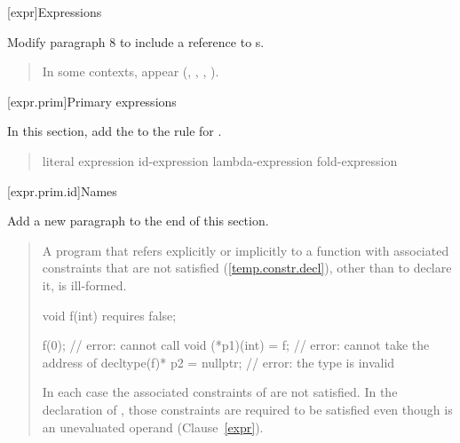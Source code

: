 

\setcounter{chapter}{7}
[expr]{Expressions}

Modify paragraph 8 to include a reference to s.

\begin{quote}
\pnum
In some contexts,  appear
(\added{\ref{expr.prim.req}, }, , 
, ).
\end{quote}

[expr.prim]{Primary expressions}

In this section, add the
 to the rule for 
.

\begin{quote}
\begin{bnf}
\br
    literal\br
    \br
    \terminal{(} expression \terminal{)}\br
    id-expression\br
    lambda-expression\br
    fold-expression\br
\end{bnf}
\end{quote}

\setcounter{subsection}{3}
[expr.prim.id]{Names}

Add a new paragraph to the end of this section.

\begin{quote}
\begin{addedblock}
\setcounter{Paras}{2}
\pnum
A program that refers explicitly or implicitly to a function with associated 
constraints that are not satisfied (\ref{temp.constr.decl}), other than to 
declare it, is ill-formed.
% 
\enterexample
\begin{codeblock}
void f(int) requires false;

f(0);                      // error: cannot call 
void (*p1)(int) = f;       // error: cannot take the address of 
decltype(f)* p2 = nullptr; // error: the type  is invalid
\end{codeblock}
In each case the associated constraints of  are not satisfied. In the 
declaration of , those constraints are required to be satisfied even 
though  is an unevaluated operand (Clause~\ref{expr}).
\exitexample
\end{addedblock}
\end{quote}


